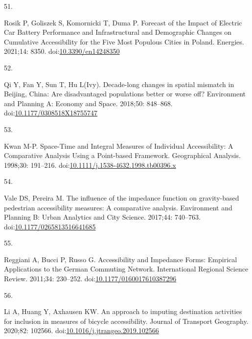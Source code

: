 \documentclass[10pt,letterpaper]{article}
\newlength{\cslhangindent}
\newlength{\csllabelwidth}
\newlength{\cslentryspacingunit} %
\newenvironment{CSLReferences}[2] %
 {%
  \setlength{\parindent}{0pt}
  \ifodd #1
  \let\oldpar\par
  \def\par{\hangindent=\cslhangindent\oldpar}
  \fi
  \setlength{\parskip}{#2\cslentryspacingunit}
 }%
 {}
\newcommand{\CSLLeftMargin}[1]{\parbox[t]{\csllabelwidth}{#1}}
\newcommand{\CSLRightInline}[1]{\parbox[t]{\linewidth - \csllabelwidth}{#1}\break}
\begin{document}
\begin{CSLReferences}{0}{0}
\leavevmode{}%
\CSLLeftMargin{51. }%
\CSLRightInline{Rosik P, Goliszek S, Komornicki T, Duma P. Forecast of
the {Impact} of {Electric} {Car} {Battery} {Performance} and
{Infrastructural} and {Demographic} {Changes} on {Cumulative}
{Accessibility} for the {Five} {Most} {Populous} {Cities} in {Poland}.
Energies. 2021;14: 8350.
doi:\href{https://doi.org/10.3390/en14248350}{10.3390/en14248350}}

\leavevmode{}%
\CSLLeftMargin{52. }%
\CSLRightInline{Qi Y, Fan Y, Sun T, Hu L(Ivy). Decade-long changes in
spatial mismatch in {Beijing}, {China}: {Are} disadvantaged populations
better or worse off? Environment and Planning A: Economy and Space.
2018;50: 848--868.
doi:\href{https://doi.org/10.1177/0308518X18755747}{10.1177/0308518X18755747}}

\leavevmode{}%
\CSLLeftMargin{53. }%
\CSLRightInline{Kwan M-P. Space-{Time} and {Integral} {Measures} of
{Individual} {Accessibility}: {A} {Comparative} {Analysis} {Using} a
{Point}-based {Framework}. Geographical Analysis. 1998;30: 191--216.
doi:\href{https://doi.org/10.1111/j.1538-4632.1998.tb00396.x}{10.1111/j.1538-4632.1998.tb00396.x}}

\leavevmode{}%
\CSLLeftMargin{54. }%
\CSLRightInline{Vale DS, Pereira M. The influence of the impedance
function on gravity-based pedestrian accessibility measures: {A}
comparative analysis. Environment and Planning B: Urban Analytics and
City Science. 2017;44: 740--763.
doi:\href{https://doi.org/10.1177/0265813516641685}{10.1177/0265813516641685}}

\leavevmode{}%
\CSLLeftMargin{55. }%
\CSLRightInline{Reggiani A, Bucci P, Russo G. Accessibility and
{Impedance} {Forms}: {Empirical} {Applications} to the {German}
{Commuting} {Network}. International Regional Science Review. 2011;34:
230--252.
doi:\href{https://doi.org/10.1177/0160017610387296}{10.1177/0160017610387296}}

\leavevmode{}%
\CSLLeftMargin{56. }%
\CSLRightInline{Li A, Huang Y, Axhausen KW. An approach to imputing
destination activities for inclusion in measures of bicycle
accessibility. Journal of Transport Geography. 2020;82: 102566.
doi:\href{https://doi.org/10.1016/j.jtrangeo.2019.102566}{10.1016/j.jtrangeo.2019.102566}}


\end{CSLReferences}
\end{document}
